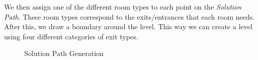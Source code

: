 \documentclass[11pt]{article}
\begin{document}
We then assign one of the different room types to each point on the \textit{Solution Path}. These room types correspond to the exits/entrances that each room needs. After this, we draw a boundary around the level. This way we can create a level using four different categories of exit types.

\begin{figure}[!htb]\centering
   \begin{minipage}{0.49\textwidth}
     \caption{Solution Path Generation}\label{Fig:Data1}
   \end{minipage}
   \begin {minipage}{0.49\textwidth}

\end{minipage}
\end{figure}
\end{document}
